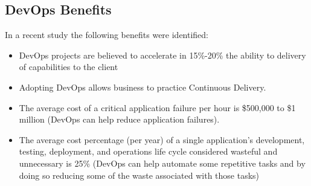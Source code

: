         \subsection{DevOps Benefits}
        In a recent study \cite{Elliot2015} the following benefits were identified:
  		  \begin{itemize}
            \item DevOps projects are believed to accelerate in 15\%-20\% the ability to delivery of capabilities to the client
            \item Adopting DevOps allows business to practice Continuous Delivery.
            \item The average cost of a critical application failure per hour is \$500,000 to \$1 million (DevOps can help reduce application failures).
            \item The average cost percentage (per year) of a single application's development, testing, deployment, and operations life cycle considered wasteful and unnecessary is 25\% (DevOps can help automate some repetitive tasks and by doing so reducing some of the waste associated with those tasks)
  		  \end{itemize}

